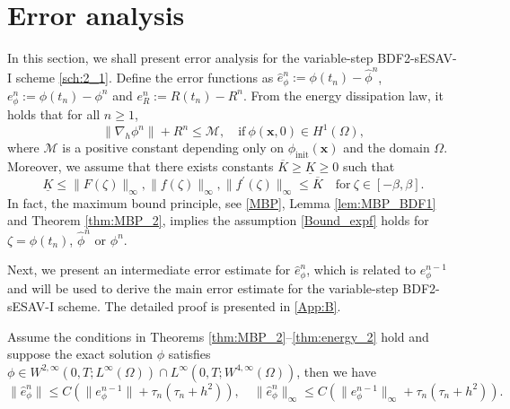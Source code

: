 \documentclass{m2an}
\begin{document}
\section{Error analysis}\label{sec:Error}
In this section, we shall present error analysis for the variable-step BDF2-sESAV-I scheme \eqref{sch:2_1}. Define the error functions as $
\hat{e}_{\phi}^{n} := \phi( t_{n} ) - \hat{\phi}^n$, $e_{\phi}^{n} := \phi( t_{n} ) - \phi^n$ and  $e_{R}^{n} := R( t_{n} ) - R^n$. From the energy dissipation law, it holds that for all $ n \ge 1$,
\begin{equation*}\label{Bound_s}
	\| \nabla_{h} \phi^{n} \| + R^{n} \leq \mathcal{M}, \quad \text{if} \  \phi( \mathbf{x}, 0 ) \in H^{1} ( \Omega ),
\end{equation*}
where $ \mathcal{M} $ is a positive constant depending only on $ \phi_{\text{init}}( \mathbf{x} ) $ and the domain $ \Omega $. 
Moreover, we assume that there exists constants $ \overline{K} \geq \underline{K} \geq 0 $ such that
\begin{equation}\label{Bound_expf}
	\underline{K} \leq \| F( \zeta ) \|_{\infty}, \| f( \zeta ) \|_{\infty}, \| f^{\prime}( \zeta ) \|_{\infty} \leq \overline{K} \quad \text{for}~ \zeta \in [-\beta,\beta].
\end{equation}
In fact, the maximum bound principle, see \eqref{MBP}, Lemma \ref{lem:MBP_BDF1} and Theorem \ref{thm:MBP_2}, implies the assumption \eqref{Bound_expf} holds for
$ \zeta = \phi( t_{n} ) $, $ \hat{\phi}^n $ or $ \phi^{n} $.  

Next, we present an intermediate error estimate for $ \hat{e}_{\phi}^{n} $, which is related to $ e_{\phi}^{n-1}$ and will be used to derive the main error estimate for the variable-step BDF2-sESAV-I scheme. %
The detailed proof is presented in  \ref{App:B}.
\begin{lmm}\label{lem:estihat} 
	Assume the conditions in Theorems \ref{thm:MBP_2}--\ref{thm:energy_2} hold and suppose the exact solution $ \phi $ satisfies
	$
	\phi \in W^{2,\infty}(0,T;L^{\infty}(\Omega)) \cap L^{\infty}(0,T;W^{4,\infty}(\Omega))
	$, then we have
	\begin{equation*}
		\| \hat{e}_{\phi}^{n} \| \leq C ( \| e_{\phi}^{n-1} \| + \tau_{n} ( \tau_{n} + h^2 )), \quad \| \hat{e}_{\phi}^{n} \|_{\infty} \leq C (\| e_{\phi}^{n-1} \|_{\infty} + \tau_{n} ( \tau_{n} + h^2 )).
	\end{equation*}
\end{lmm}
\end{document}
